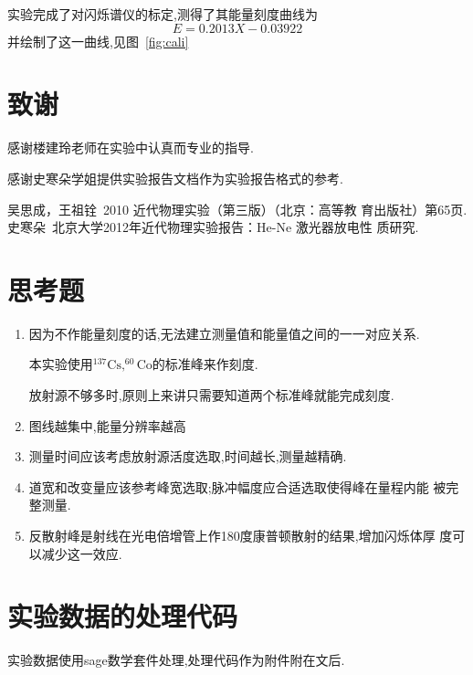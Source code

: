 \documentclass[aps,pre,12pt,preprint,onecolumn,showpacs,showkeys]{revtex4-1}
\begin{document}
实验完成了对闪烁谱仪的标定,测得了其能量刻度曲线为
\begin{equation}
  E = 0.2013X −0.03922
\end{equation}
并绘制了这一曲线,见图~\ref{fig:cali}
\section{致谢}
 
感谢楼建玲老师在实验中认真而专业的指导.

感谢史寒朵学姐提供实验报告文档作为实验报告格式的参考.

\begin{thebibliography}{}
 吴思成，王祖铨~2010 近代物理实验（第三版）（北京：高等教
育出版社）第65页.
 史寒朵~北京大学2012年近代物理实验报告：He-Ne 激光器放电性
质研究.
\end{thebibliography}
 
\clearpage
\appendix
\section{思考题}
\begin{enumerate}
\item 因为不作能量刻度的话,无法建立测量值和能量值之间的一一对应关系.

本实验使用$^{137}\text{Cs},^{60}\text{Co}$的标准峰来作刻度.

放射源不够多时,原则上来讲只需要知道两个标准峰就能完成刻度.
\item 图线越集中,能量分辨率越高
\item 测量时间应该考虑放射源活度选取,时间越长,测量越精确.
\item 道宽和改变量应该参考峰宽选取;脉冲幅度应合适选取使得峰在量程内能
  被完整测量.
\item 反散射峰是射线在光电倍增管上作180度康普顿散射的结果,增加闪烁体厚
  度可以减少这一效应.
\end{enumerate}
 
 \section{实验数据的处理代码}

实验数据使用sage数学套件处理,处理代码作为附件附在文后.

\newpage


\end{document}
